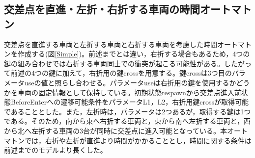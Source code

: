 \documentclass{tpu-sotu}
\begin{document}
	\newpage
	
	\subsection{交差点を直進・左折・右折する車両の時間オートマトン}
	交差点を直進する車両と左折する車両と右折する車両を考慮した時間オートマトンを作成する(図\ref{Simple})。前述までとは違い，右折する場合もあるため，4つの鍵の組み合わせでは右折する車両同士での衝突が起こる可能性がある。したがって前述の4つの鍵に加えて，右折用の鍵crossを用意する。鍵crossは3つ目のパラメータuseの値と照らし合わせる。パラメータuseは右折用の鍵を使用するかどうかを車両の固定情報として保持している。初期状態respawnから交差点進入前状態BeforeEnterへの遷移可能条件をパラメータL1，L2，右折用鍵crossが取得可能であることとした。また，左折時は，パラメータは2つあるが，取得する鍵は1つである。そのため，南から東へ右折する車両と，東から南へ左折する車両と，西から北へ左折する車両の3台が同時に交差点に進入可能となっている。本オートマトンでは，右折や左折が直進より時間がかかることとし，時間に関する条件は前述までのモデルより長くした。
	
\end{document}
